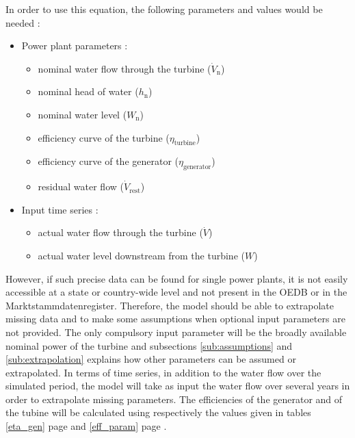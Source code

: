 In order to use this equation, the following parameters and values would be needed : 

\begin{itemize}
\itemsep0em
 \item Power plant parameters : 
 \begin{itemize}
  \item nominal water flow through the turbine ($\dot{V}_\mathrm{n}$)
  \item nominal head of water ($h_\mathrm{n}$)
  \item nominal water level ($W_\mathrm{n}$)
  \item efficiency curve of the turbine ($\eta_\mathrm{turbine}$) 
  \item efficiency curve of the generator ($\eta_\mathrm{generator}$)  
  \item residual water flow ($\dot{V}_\mathrm{rest}$)  
 \end{itemize}
 \item Input time series : 
 \begin{itemize}
  \item actual water flow through the turbine ($\dot{V}$)
  \item actual water level downstream from the turbine ($W$)
 \end{itemize}
\end{itemize}

However, if such precise data can be found for single power plants, it is not easily accessible at a state or country-wide level and not present in the OEDB or in the Marktstammdatenregister. 
Therefore, the model should be able to extrapolate missing data and to make some assumptions when optional input parameters are not provided. The only compulsory input parameter will be the broadly available nominal power of the turbine and subsections \ref{sub:assumptions} and \ref{sub:extrapolation} explains how other parameters can be assumed or extrapolated. \newline
In terms of time series, in addition to the water flow over the simulated period, the model will take as input the water flow over several years in order to extrapolate missing parameters.
The efficiencies of the generator and of the tubine will be calculated using respectively the values given in tables \ref{eta_gen} page \pageref{eta_gen} and \ref{eff_param} page \pageref{eff_param}.

